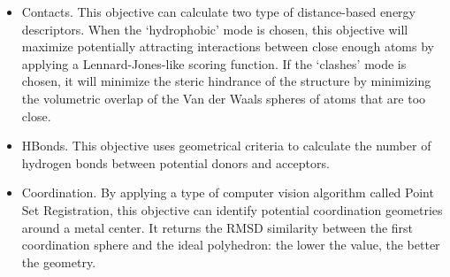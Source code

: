 \begin{itemize}
	\item Contacts. This objective can calculate two type of distance-based energy descriptors. When the ‘hydrophobic’ mode is chosen, this objective will maximize potentially attracting interactions between close enough atoms by applying a Lennard-Jones-like scoring function. If the ‘clashes’ mode is chosen, it will minimize the steric hindrance of the structure by minimizing the volumetric overlap of the Van der Waals spheres of atoms that are too close.

	\item HBonds. This objective uses geometrical criteria to calculate the number of hydrogen bonds between potential donors and acceptors.

	\item Coordination. By applying a type of computer vision algorithm called Point Set Registration, this objective can identify potential coordination geometries around a metal center. It returns the RMSD similarity between the first coordination sphere and the ideal polyhedron: the lower the value, the better the geometry.
\end{itemize}





